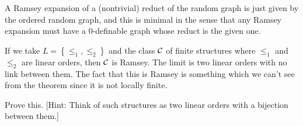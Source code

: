 \documentclass{amsart}
\begin{document}
\begin{exm}
A Ramsey expansion of a (nontrivial) reduct of the random graph is just given by the
ordered random graph, and this is minimal in the sense that any Ramsey expansion must have
a $0$-definable graph whose reduct is the given one.
\end{exm}
\begin{exm}
If we take $L = \left\{ \leq_1 , \leq_2 \right\}$ and the class $\mathcal{C}$ of finite
structures where $\leq_1$ and $\leq_2$ are linear orders, then $\mathcal{C}$ is Ramsey. 
The \Fraisse limit is two linear orders with no link between them.
The fact that this is Ramsey is something which we can't see from the theorem since it is
not locally finite.
\begin{exr}[*]
Prove this. 
[Hint: Think of such structures as two linear orders with a bijection between them.]
\end{exr}
\end{exm}
\end{document}
